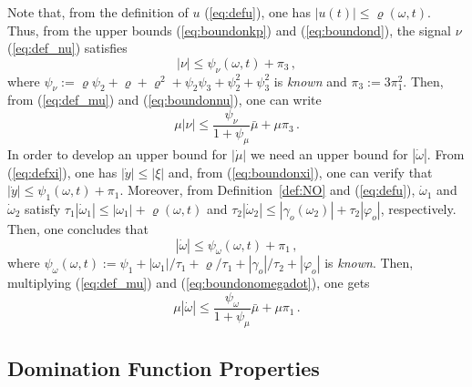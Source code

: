 \documentclass{rncauth}
\begin{document}
Note that, from the definition of $u$ (\ref{eq:defu}), one has
$|u(t)| \leq \varrho(\omega,t)$. Thus, from the upper bounds
(\ref{eq:boundonkp}) and (\ref{eq:boundond}), the signal $\nu$
(\ref{eq:def_nu}) satisfies
%
\begin{equation}
|\nu| \leq \psi_\nu(\omega,t)+\pi_3\,,\label{eq:boundonnu}
\end{equation}
%
where $\psi_\nu:=\varrho \psi_2+ \varrho+
\varrho^2+\psi_2\psi_3+\psi_2^2 + \psi_3^2$ is {\em known} and
$\pi_3:=3\pi_1^2$. Then, from (\ref{eq:def_mu}) and
(\ref{eq:boundonnu}), one can write
%
\begin{equation}
\mu|\nu| \leq
\frac{\psi_\nu}{1+\psi_\mu}\bar{\mu}+\mu\pi_3\,.\label{eq:boundonmunu}
\end{equation}
%
In order to develop an upper bound for $|\dot{\mu}|$ we need an
upper bound for $|\dot{\omega}|$. From (\ref{eq:defxi}), one has
$|\dot{y}| \leq |\xi|$ and, from (\ref{eq:boundonxi}), one can
verify that $|\dot{y}| \leq \psi_1(\omega,t) + \pi_1$. Moreover,
from Definition~\ref{def:NO} and (\ref{eq:defu}), $\dot{\omega}_1$
and $\dot{\omega}_2$ satisfy $\tau_1|\dot{\omega}_1| \leq
|\omega_1|
+ \varrho(\omega,t)$ and %
$\tau_2 |\dot{\omega}_2| \leq
|\gamma_o(\omega_2)|+\tau_2|\varphi_o|$,
respectively. %
%
Then, one concludes that
%
\begin{equation}\label{eq:boundonomegadot}
|\dot{\omega}| \leq \psi_\omega(\omega,t)+\pi_1\,,
\end{equation}
%
where %
$\psi_\omega(\omega,t):=\psi_1 + |\omega_1|/\tau_1 +
\varrho/\tau_1 + |\gamma_o|/\tau_2+|\varphi_o|$ is {\em known}.
Then, multiplying (\ref{eq:def_mu}) and
(\ref{eq:boundonomegadot}), one gets
%
\begin{equation}
\mu|\dot{\omega}| \leq
\frac{\psi_\omega}{1+\psi_\mu}\bar{\mu}+\mu\pi_1\,.\label{eq:boundonmudotomega}
\end{equation}
%

\subsection{Domination Function Properties}
\end{document}
